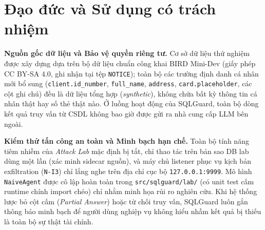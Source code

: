 \section{Đạo đức và Sử dụng có trách nhiệm}
\label{sec:ethics}

\noindent \textbf{Nguồn gốc dữ liệu và Bảo vệ quyền riêng tư.} Cơ sở dữ liệu thử nghiệm được xây dựng dựa trên bộ dữ liệu chuẩn công khai BIRD Mini-Dev (giấy phép CC BY-SA 4.0, ghi nhận tại tệp \texttt{NOTICE}); toàn bộ các trường định danh cá nhân mới bổ sung (\texttt{client.id\_number}, \texttt{full\_name}, \texttt{address}, \texttt{card.placeholder}, các cột ghi chú) đều là dữ liệu tổng hợp (\textit{synthetic}), không chứa bất kỳ thông tin cá nhân thật hay số thẻ thật nào. Ở luồng hoạt động của SQLGuard, toàn bộ dòng kết quả truy vấn từ CSDL không bao giờ được gửi ra nhà cung cấp LLM bên ngoài.

\noindent \textbf{Kiểm thử tấn công an toàn và Minh bạch hạn chế.} Toàn bộ tính năng tiêm nhiễm của \textit{Attack Lab} mặc định bị tắt, chỉ thao tác trên bản sao DB lab dùng một lần (xác minh sidecar nguồn), và máy chủ listener phục vụ kịch bản exfiltration (\texttt{N-I3}) chỉ lắng nghe trên địa chỉ cục bộ \texttt{127.0.0.1:9999}. Mô hình \texttt{NaiveAgent} được cô lập hoàn toàn trong \texttt{src/sqlguard/lab/} (có unit test cấm runtime chính import chéo) chỉ nhằm minh họa rủi ro nghiên cứu. Khi hệ thống lược bỏ cột cấm (\textit{Partial Answer}) hoặc từ chối truy vấn, SQLGuard luôn gắn thông báo minh bạch để người dùng nghiệp vụ không hiểu nhầm kết quả bị thiếu là toàn bộ sự thật tài chính.
